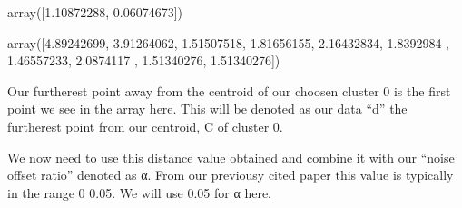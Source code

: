 \documentclass[letterpaper,10pt,english]{jupyterBook}
\begin{document}
\begin{sphinxVerbatim}[commandchars=\\\{\}]
\PYG{p}{[}\PYG{p}{]}
\end{sphinxVerbatim}

\begin{sphinxVerbatim}[commandchars=\\\{\}]
array([\PYGZhy{}1.10872288, \PYGZhy{}0.06074673])
\end{sphinxVerbatim}

\begin{sphinxVerbatim}[commandchars=\\\{\}]
   
   

    
\PYG{p}{[}\PYG{p}{]}
\end{sphinxVerbatim}

\begin{sphinxVerbatim}[commandchars=\\\{\}]
array([4.89242699, 3.91264062, 1.51507518, 1.81656155, 2.16432834,
       1.8392984 , 1.46557233, 2.0874117 , 1.51340276, 1.51340276])
\end{sphinxVerbatim}

\sphinxAtStartPar
Our furtherest point away from the centroid of our choosen cluster 0 is the first point we see in the array here. This will be denoted as our data “d” the furtherest point from our centroid, C of cluster 0.

\sphinxAtStartPar
We now need to use this distance value obtained and combine it with our “noise offset ratio” denoted as α. From our previousy cited paper this value is typically in the range 0 \sphinxhyphen{} 0.05. We will use 0.05 for α here.

\begin{sphinxVerbatim}[commandchars=\\\{\}]
  \PYG{p}{[}\PYG{p}{]}\PYG{p}{[}\PYG{p}{]}
  
\end{sphinxVerbatim}
\end{document}
